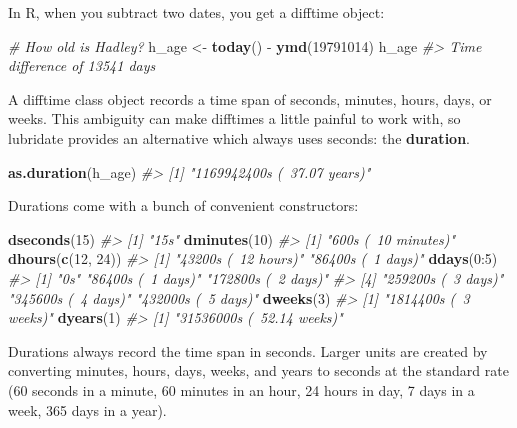 \documentclass[]{book}
\newenvironment{Shaded}{\begin{snugshade}}{\end{snugshade}}
\newcommand{\KeywordTok}[1]{\textcolor[rgb]{0.13,0.29,0.53}{\textbf{{#1}}}}
\newcommand{\DecValTok}[1]{\textcolor[rgb]{0.00,0.00,0.81}{{#1}}}
\newcommand{\StringTok}[1]{\textcolor[rgb]{0.31,0.60,0.02}{{#1}}}
\newcommand{\CommentTok}[1]{\textcolor[rgb]{0.56,0.35,0.01}{\textit{{#1}}}}
\newcommand{\NormalTok}[1]{{#1}}
\begin{document}
In R, when you subtract two dates, you get a difftime object:

\begin{Shaded}
\begin{Highlighting}[]
\CommentTok{# How old is Hadley?}
\NormalTok{h_age <-}\StringTok{ }\KeywordTok{today}\NormalTok{() -}\StringTok{ }\KeywordTok{ymd}\NormalTok{(}\DecValTok{19791014}\NormalTok{)}
\NormalTok{h_age}
\CommentTok{#> Time difference of 13541 days}
\end{Highlighting}
\end{Shaded}

A difftime class object records a time span of seconds, minutes, hours,
days, or weeks. This ambiguity can make difftimes a little painful to
work with, so lubridate provides an alternative which always uses
seconds: the \textbf{duration}.

\begin{Shaded}
\begin{Highlighting}[]
\KeywordTok{as.duration}\NormalTok{(h_age)}
\CommentTok{#> [1] "1169942400s (~37.07 years)"}
\end{Highlighting}
\end{Shaded}

Durations come with a bunch of convenient constructors:

\begin{Shaded}
\begin{Highlighting}[]
\KeywordTok{dseconds}\NormalTok{(}\DecValTok{15}\NormalTok{)}
\CommentTok{#> [1] "15s"}
\KeywordTok{dminutes}\NormalTok{(}\DecValTok{10}\NormalTok{)}
\CommentTok{#> [1] "600s (~10 minutes)"}
\KeywordTok{dhours}\NormalTok{(}\KeywordTok{c}\NormalTok{(}\DecValTok{12}\NormalTok{, }\DecValTok{24}\NormalTok{))}
\CommentTok{#> [1] "43200s (~12 hours)" "86400s (~1 days)"}
\KeywordTok{ddays}\NormalTok{(}\DecValTok{0}\NormalTok{:}\DecValTok{5}\NormalTok{)}
\CommentTok{#> [1] "0s"                "86400s (~1 days)"  "172800s (~2 days)"}
\CommentTok{#> [4] "259200s (~3 days)" "345600s (~4 days)" "432000s (~5 days)"}
\KeywordTok{dweeks}\NormalTok{(}\DecValTok{3}\NormalTok{)}
\CommentTok{#> [1] "1814400s (~3 weeks)"}
\KeywordTok{dyears}\NormalTok{(}\DecValTok{1}\NormalTok{)}
\CommentTok{#> [1] "31536000s (~52.14 weeks)"}
\end{Highlighting}
\end{Shaded}

Durations always record the time span in seconds. Larger units are
created by converting minutes, hours, days, weeks, and years to seconds
at the standard rate (60 seconds in a minute, 60 minutes in an hour, 24
hours in day, 7 days in a week, 365 days in a year).
\end{document}

